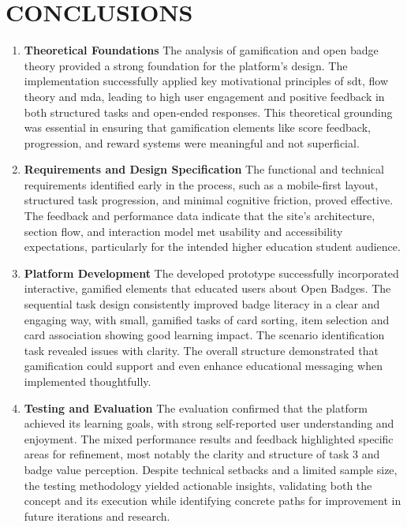 \section*{CONCLUSIONS}
\begin{enumerate}
    \item \textbf{Theoretical Foundations} The analysis of gamification and open badge theory provided a strong foundation for the platform’s design. 
    The implementation successfully applied key motivational principles of \acrshort{sdt}, flow theory and \acrshort{mda}, leading to high user engagement and positive feedback in both structured tasks and open-ended responses. 
    This theoretical grounding was essential in ensuring that gamification elements like score feedback, progression, and reward systems were meaningful and not superficial.
    \item \textbf{Requirements and Design Specification} The functional and technical requirements identified early in the process, such as a mobile-first layout, structured task progression, and minimal cognitive friction, proved effective. 
    The feedback and performance data indicate that the site's architecture, section flow, and interaction model met usability and accessibility expectations, particularly for the intended higher education student audience.
    \item \textbf{Platform Development} The developed prototype successfully incorporated interactive, gamified elements that educated users about Open Badges. 
    The sequential task design consistently improved badge literacy in a clear and engaging way, with small, gamified tasks of card sorting, item selection and card association showing good learning impact. 
    The scenario identification task revealed issues with clarity. 
    The overall structure demonstrated that gamification could support and even enhance educational messaging when implemented thoughtfully.
    \item \textbf{Testing and Evaluation} The evaluation confirmed that the platform achieved its learning goals, with strong self-reported user understanding and enjoyment. 
    The mixed performance results and feedback highlighted specific areas for refinement, most notably the clarity and structure of task 3 and badge value perception. 
    Despite technical setbacks and a limited sample size, the testing methodology yielded actionable insights, validating both the concept and its execution while identifying concrete paths for improvement in future iterations and research.
\end{enumerate}

\newpage